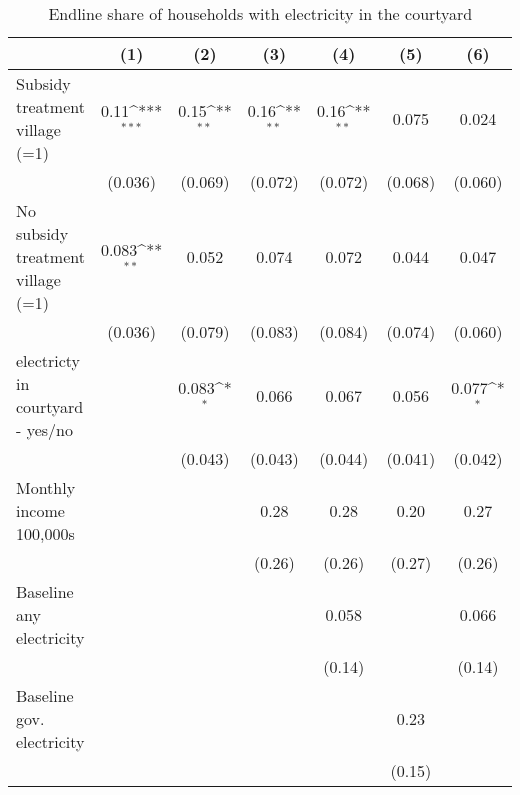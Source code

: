 \begin{table}[htbp]\centering
\def\sym#1{\ifmmode^{#1}\else\(^{#1}\)\fi}
\caption{Endline share of households with electricity in the courtyard}
\begin{tabular*}{1\hsize}{@{\hskip\tabcolsep\extracolsep\fill}l*{6}{c}}
\toprule
                &\multicolumn{1}{c}{(1)}         &\multicolumn{1}{c}{(2)}         &\multicolumn{1}{c}{(3)}         &\multicolumn{1}{c}{(4)}         &\multicolumn{1}{c}{(5)}         &\multicolumn{1}{c}{(6)}         \\
\midrule
Subsidy treatment village (=1)&     0.11\sym{***}&     0.15\sym{**} &     0.16\sym{**} &     0.16\sym{**} &    0.075         &    0.024         \\
                &  (0.036)         &  (0.069)         &  (0.072)         &  (0.072)         &  (0.068)         &  (0.060)         \\
No subsidy treatment village (=1)&    0.083\sym{**} &    0.052         &    0.074         &    0.072         &    0.044         &    0.047         \\
                &  (0.036)         &  (0.079)         &  (0.083)         &  (0.084)         &  (0.074)         &  (0.060)         \\
electricty in courtyard - yes/no&                  &    0.083\sym{*}  &    0.066         &    0.067         &    0.056         &    0.077\sym{*}  \\
                &                  &  (0.043)         &  (0.043)         &  (0.044)         &  (0.041)         &  (0.042)         \\
Monthly income 100,000s&                  &                  &     0.28         &     0.28         &     0.20         &     0.27         \\
                &                  &                  &   (0.26)         &   (0.26)         &   (0.27)         &   (0.26)         \\
Baseline any electricity&                  &                  &                  &    0.058         &                  &    0.066         \\
                &                  &                  &                  &   (0.14)         &                  &   (0.14)         \\
Baseline gov. electricity&                  &                  &                  &                  &     0.23         &                  \\
                &                  &                  &                  &                  &   (0.15)         &                  \\

\end{tabular*}
\end{table}
